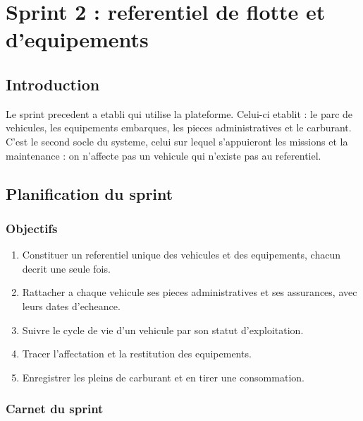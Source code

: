\chapter{Sprint 2 : referentiel de flotte et d'equipements}
\label{chap:sprint2}

\section*{Introduction}

Le sprint precedent a etabli qui utilise la plateforme. Celui-ci etablit
 : le parc de vehicules, les
equipements embarques, les pieces administratives et le carburant. C'est
le second socle du systeme, celui sur lequel s'appuieront les missions et
la maintenance : on n'affecte pas un vehicule qui n'existe pas au
referentiel.

\section{Planification du sprint}

\subsection{Objectifs}

\begin{enumerate}
  \item Constituer un referentiel unique des vehicules et des
    equipements, chacun decrit une seule fois.
  \item Rattacher a chaque vehicule ses pieces administratives et ses
    assurances, avec leurs dates d'echeance.
  \item Suivre le cycle de vie d'un vehicule par son statut
    d'exploitation.
  \item Tracer l'affectation et la restitution des equipements.
  \item Enregistrer les pleins de carburant et en tirer une consommation.
\end{enumerate}

\subsection{Carnet du sprint}

